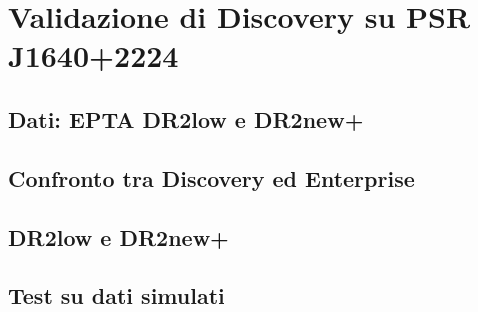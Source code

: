 
\chapter{Validazione di Discovery su PSR J1640+2224} \label{chpt:validazione}
\sloppy

\section{Dati: EPTA DR2low e DR2new+} \label{sec:dati}

\section{Confronto tra Discovery ed Enterprise} \label{sec:confronto_disc_ent}

\section{DR2low e DR2new+} \label{sec:dr2low_dr2new}

\section{Test su dati simulati} \label{sec:test_simulati}
